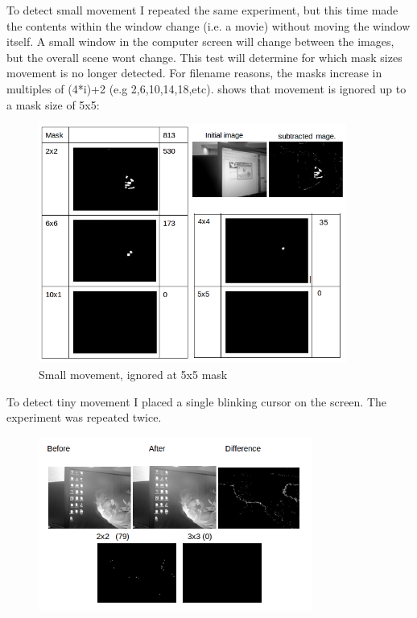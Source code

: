 {{To detect small movement I repeated the same experiment, but this time made the contents within the window change (i.e. a movie) without moving the window itself.  A small window in the computer screen will change between the images, but the overall scene wont change. This test will determine for which mask sizes movement is no longer detected.
For filename reasons, the masks increase in multiples of (4*i)+2  (e.g 2,6,10,14,18,etc).  shows that movement is ignored up to a mask size of 5x5:
\begin{figure}[H]
	\vspace{30pt}
	\begin{center}
		\includegraphics[width=0.9\textwidth]{../images/ImageOps/SMALL}
	\end{center}
	\vspace{10pt}
	\caption{Small  movement, ignored at 5x5 mask}	
	\label{img:small}
	\vspace{20pt}
\end{figure}
\pagebreak
To  detect tiny movement I placed a single blinking cursor on the screen. The experiment was repeated twice.
\begin{figure}[H]
	\vspace{-10pt}
	\begin{center}
		\includegraphics[width=0.8\textwidth]{../images/ImageOps/CURSOR1}

\end{center}
\end{figure}}}
